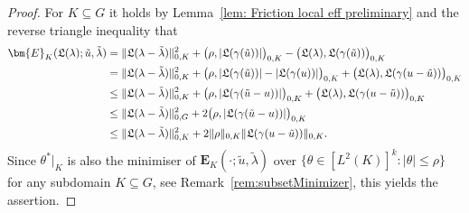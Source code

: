 \documentclass[12pt,twoside,reqno]{amsart}
\theoremstyle{definition}
\numberwithin{equation}{section}
\renewcommand{\L}{\mathfrak{L}}
\newcommand{\norm}[1]    {\Vert #1 \Vert}
\begin{document}
\begin{proof}
        
        For $K\subseteq G$ it holds by Lemma~\ref{lem: Friction local eff preliminary} and the reverse triangle inequality that
        \begin{equation*}
        \aligned
            \bm{E}_K({\L({\lambda})}; \tilde{u},\tilde{\lambda})
            &= \norm{\L(\lambda-\tilde{\lambda})}_{0,K}^2+\bigl(\rho,|\L(\gamma(\tilde{u}))|\bigr)_{0,K}-\bigl(\L(\lambda),\L(\gamma(\tilde{u}))\bigr)_{0,K}\\
            &= \norm{\L(\lambda-\tilde{\lambda})}_{0,K}^2+\bigl(\rho,|\L(\gamma(\tilde{u}))|-|\L(\gamma(u))|\bigr)_{0,K}+\bigl(\L(\lambda),\L(\gamma(u-\tilde{u}))\bigr)_{0,K}\\
            &\leq \norm{\L(\lambda-\tilde{\lambda})}_{0,K}^2+\bigl(\rho,|\L(\gamma(\tilde{u}-u))|\bigr)_{0,K}+\bigl(\L(\lambda),\L(\gamma(u-\tilde{u}))\bigr)_{0,K}\\
            &\leq \norm{\L(\lambda-\tilde{\lambda})}_{0,G}^2+2\bigl(\rho,|\L(\gamma(\tilde{u}-u))|\bigr)_{0,K}\\
            &\leq \norm{\L(\lambda-\tilde{\lambda})}_{0,K}^2 +2 \norm{\rho}_{0,K}\norm{\L(\gamma(u-\tilde{u}))}_{0,K}.
            \endaligned
        \end{equation*}
        Since $\theta^*|_K$ is also the minimiser of $\bm{E}_K(\cdot; \tilde{u},\tilde{\lambda})$ over $\{\theta \in [L^2(K)]^k: |\theta| \leq \rho \}$ for any subdomain $K\subseteq G$, see Remark~\ref{rem:subsetMinimizer}, this yields the assertion. 
    \end{proof}
\end{document}
